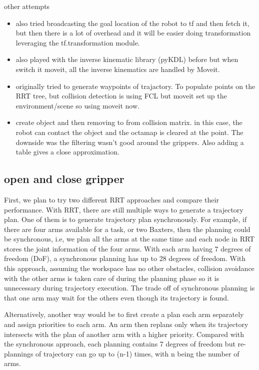 other attempts
\begin{itemize}
\item also tried broadcasting the goal location of the robot to tf and then fetch it, but then there is a lot of overhead and it will be easier doing transformation leveraging the tf.transformation module.
\item also played with the inverse kinematic library (pyKDL) before but when switch it moveit, all the inverse kinematics are handled by Moveit.
\item originally tried to generate waypoints of trajactory. To populate points on the RRT tree, but collision detection is using FCL but moveit set up the environment/scene so using moveit now.
\item create object and then removing to from collision matrix. in this case, the robot can contact the object and the octamap is cleared at the point. The downside was the filtering wasn't good around the grippers. Also adding a table gives a close approximation. 
\end{itemize}

\subsection{open and close gripper}



First, we plan to try two different RRT approaches and compare their performance. With RRT, there are still multiple ways to generate a trajectory plan.
One of them is to generate trajectory plan synchronously.
For example, if there are four arms available for a task, or two Baxters, then the planning could be synchronous, i.e, we plan all the arms at the same time and each node in RRT stores the joint information of the four arms. With each arm having 7 degrees of freedom (DoF), a synchronous planning has up to 28 degrees of freedom.
With this approach, assuming the workspace has no other obstacles, collision avoidance with the other arms is taken care of during the planning phase so it is unnecessary during trajectory execution.  
The trade off of synchronous planning is that one arm may wait for the others even though its trajectory is found.

Alternatively, another way would be to first create a plan each arm separately and assign priorities to each arm. An arm then replans only when its trajectory intersects with the plan of another arm with a higher priority. Compared with the synchronous approach, each planning contains 7 degrees of freedom but re-plannings of trajectory can go up to (n-1) times, with n being the number of arms. 

